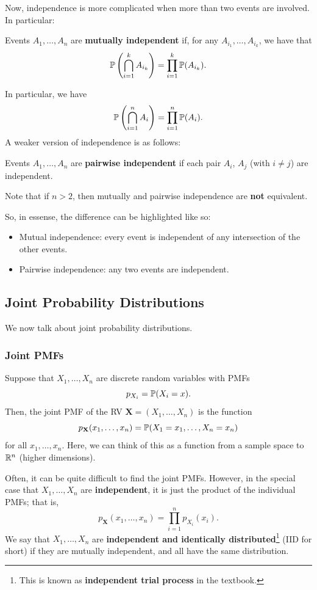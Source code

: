 Now, independence is more complicated when more than two events are involved. In particular:
\begin{definition}{}{}
    Events $A_1, \dots, A_n$ are \textbf{mutually independent} if, for any $A_{i_1}, \dots, A_{i_k}$, we have that 
    \[\mathbb{P}\left(\bigcap_{i = 1}^{k} A_{i_k} \right) = \prod_{i = 1}^{k} \mathbb{P}(A_{i_k}).\]
\end{definition}
In particular, we have
\[\mathbb{P}\left(\bigcap_{i = 1}^{n} A_{i} \right) = \prod_{i = 1}^{n} \mathbb{P}(A_{i}).\]
A weaker version of independence is as follows: 
\begin{definition}{}{}
    Events $A_1, \dots, A_n$ are \textbf{pairwise independent} if each pair $A_i$, $A_j$ (with $i \neq j$) are independent.
\end{definition}
Note that if $n > 2$, then mutually and pairwise independence are \textbf{not} equivalent.

\bigskip 

So, in essense, the difference can be highlighted like so: 
\begin{itemize}
    \item Mutual independence: every event is independent of any intersection of the other events. 
    \item Pairwise independence: any two events are independent. 
\end{itemize}

\subsection{Joint Probability Distributions}
We now talk about joint probability distributions. 

\subsubsection{Joint PMFs}
Suppose that $X_1, \dots, X_n$ are discrete random variables with PMFs 
\[p_{X_i} = \mathbb{P}(X_i = x).\]
Then, the joint PMF of the RV $\mathbf{X} = (X_1, \dots, X_n)$ is the function 
\[p_{\mathbf{X}}(x_1, \dots, x_n) = \mathbb{P}(X_1 = x_1, \dots, X_n = x_n)\]
for all $x_1, \dots, x_n$. Here, we can think of this as a function from a sample space to $\mathbb{R}^n$ (higher dimensions).

\bigskip 

Often, it can be quite difficult to find the joint PMFs. However, in the special case that $X_1, \dots, X_n$ are \textbf{independent}, it is just the product of the individual PMFs; that is, 
\[p_{\mathbf{X}}(x_1, \dots, x_n) = \prod_{i = 1}^{n} p_{X_i}(x_i).\]
We say that $X_1, \dots, X_n$ are \textbf{independent and identically distributed}\footnote{This is known as \textbf{independent trial process} in the textbook.} (IID for short) if they are mutually independent, and all have the same distribution. 

